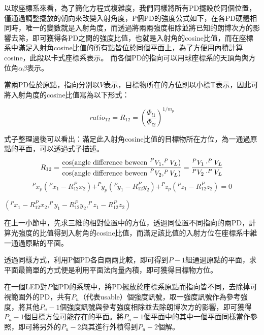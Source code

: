 以球座標系來看，為了簡化方程式複雜度，我們同樣將所有PD擺設於同個位置，僅通過調整擺放的朝向來改變入射角度，P個PD的強度公式如下，在各PD硬體相同時，唯一的變數就是入射角度，而透過將兩兩強度相除並將已知的朗博次方的影響去除，即可獲得各PD之間的強度比值，也就是入射角的cosine比值，而在座標系中滿足入射角cosine比值的所有點皆位於同個平面上，為了方便用內積計算cosine，此段以卡式座標系表示。
而各個PD的指向可以用球座標系的天頂角與方位角$\alpha\beta$表示。

當兩PD位於原點，指向分別以$V$表示，目標物所在的方位則以小標T表示，因此可將入射角度的cosine比值寫為以下形式：

\begin{equation}
    ratio_{12}=R_{12}=\left(\frac{\Phi_{l1}}{\Phi_{l2}}\right)^{1/m_p}
    \end{equation}

式子整理過後可以看出：滿足此入射角cosine比值的目標物所在方位，為一通過原點的平面，可以透過式子描述。
\begin{equation}
    R_{12} =\frac{ \cos(\text{angle difference beween }^{P}V_1,^{P}V_L)}{\cos(\text{angle difference beween }^{P}V_2,^{P}V_L)} \\
    =\frac{^{P}V_1\cdot^{P}V_L}{^{P}V_2\cdot^{P}V_L}
\end{equation}
\begin{equation}
    ^{P}x_p(^{P}x_1-R_{12}^{P}x_2)+^{P}y_p(^{P}y_1-R_{12}^{P}y_2)+^{P}z_p(^{P}z_1-R_{12}^{P}z_2)=0
\end{equation}

$(^{P}x_1-R_{12}^{P}x_2,^{P}y_1-R_{12}^{P}y_2,^{P}z_1-R_{12}^{P}z_2)$


在上一小節中，先求三維的相對位置中的方位，透過同位置不同指向的兩PD，計算光強度的比值得到入射角的cosine比值，而滿足該比值的入射方位在座標系中維一通過原點的平面。

透過同樣方式，利用P個PD各自兩兩比較，即可得到$P-1$組通過原點的平面，求平面最簡單的方式便是利用平面法向量內積，即可獲得目標物方位。



在一個LED對$P$個PD的系統中，將PD擺放於座標系原點而指向皆不同，去除掉可視範圍外的PD，共有$P_u$（代表usable）個強度訊號，取一強度訊號作為參考強度，將其他$P_u-1$個強度訊號與參考強度相除並去除朗博次方的影響，即可獲得$P_u-1$個目標方位可能存在的平面。將$P_u-1$個平面中的其中一個平面同樣當作參照，即可將另外的$P_u-2$與其進行外積得到$P_u-2$個解。


